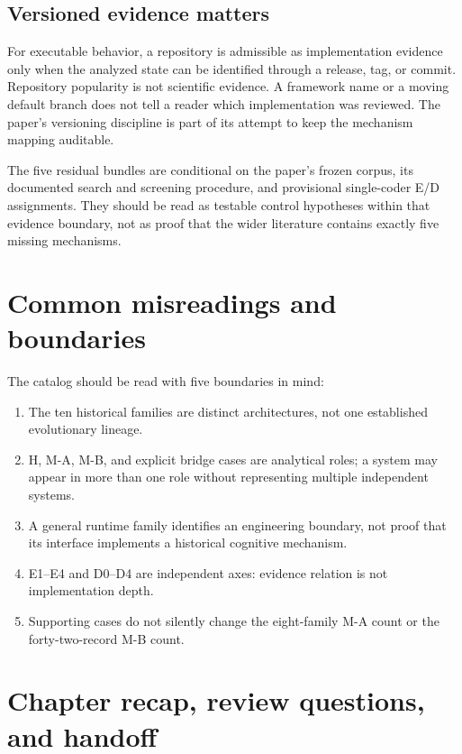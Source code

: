 \subsection{Versioned evidence matters}

For executable behavior, a repository is admissible as implementation evidence only when the analyzed state can be identified through a release, tag, or commit. Repository popularity is not scientific evidence. A framework name or a moving default branch does not tell a reader which implementation was reviewed. The paper's versioning discipline is part of its attempt to keep the mechanism mapping auditable.

\begin{warningbox}
The five residual bundles are conditional on the paper's frozen corpus, its documented search and screening procedure, and provisional single-coder E/D assignments. They should be read as testable control hypotheses within that evidence boundary, not as proof that the wider literature contains exactly five missing mechanisms.
\end{warningbox}

\section{Common misreadings and boundaries}
\label{sec:ch11-common-misreadings}

The catalog should be read with five boundaries in mind:
\begin{enumerate}
  \item The ten historical families are distinct architectures, not one established evolutionary lineage.
  \item H, M-A, M-B, and explicit bridge cases are analytical roles; a system may appear in more than one role without representing multiple independent systems.
  \item A general runtime family identifies an engineering boundary, not proof that its interface implements a historical cognitive mechanism.
  \item E1--E4 and D0--D4 are independent axes: evidence relation is not implementation depth.
  \item Supporting cases do not silently change the eight-family M-A count or the forty-two-record M-B count.
\end{enumerate}

\section{Chapter recap, review questions, and handoff}
\label{sec:ch11-recap}


